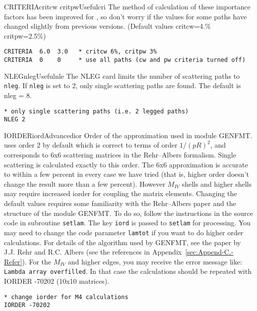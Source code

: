 \documentclass[11pt,oneside]{report} %
\begin{document}
\begin{Card}{CRITERIA}{critcw critpw}{Useful}{cri}
  The method of calculation of these importance factors has been
  improved for {\feffcur}, so don't worry if the values for
  some paths have changed slightly from previous versions.  (Default
  values critcw=4.\% critpw=2.5\%)

\begin{verbatim}
CRITERIA  6.0  3.0   * critcw 6%, critpw 3%
CRITERIA  0    0     * use all paths (cw and pw criteria turned off)
\end{verbatim}
\end{Card}


\begin{Card}{NLEG}{nleg}{Useful}{nle}
  The NLEG card limits the number of scattering paths to
  \texttt{nleg}. If \texttt{nleg} is set to 2, only single scattering
  paths are found. The default is nleg = 8.

\begin{verbatim}
* only single scattering paths (i.e. 2 legged paths)
NLEG 2
\end{verbatim}
\end{Card}




\begin{Card}{IORDER}{iord}{Advanced}{ior}
  Order of the approximation used in module GENFMT.  {\feff} uses
  order 2 by default which is correct to terms of order $1/(pR)^2$,
  and corresponds to 6x6 scattering matrices in the Rehr--Albers
  formalism.  Single scattering is calculated exactly to this order.
  The 6x6 approximation is accurate to within a few percent in every
  case we have tried (that is, higher order doesn't change the result
  more than a few percent). However $M_{\mathit{IV}}$ shells and
  higher shells may require increased iorder for coupling the matrix
  elements.  Changing the default values requires some familiarity
  with the Rehr--Albers paper and the structure of the module GENFMT.
  To do so, follow the instructions in the {\feff} source code in
  subroutine \texttt{setlam}.  The key \texttt{iord} is passed to
  \texttt{setlam} for processing.  You may need to change the code
  parameter \texttt{lamtot} if you want to do higher order
  calculations.  For details of the algorithm used by GENFMT, see the
  paper by J.J. Rehr and R.C.  Albers (see the references in
  Appendix~\ref{sec:Append-C.-Refer}).  For the
  $M_{\mathit{IV}}$ and higher edges, you may receive the error
  message like: \texttt{Lambda array overfilled}.  In that case the
  calculations should be repeated with IORDER -70202 (10x10 matrices).
\begin{verbatim}
* change iorder for M4 calculations
IORDER -70202
\end{verbatim}
\end{Card}
\end{document}
